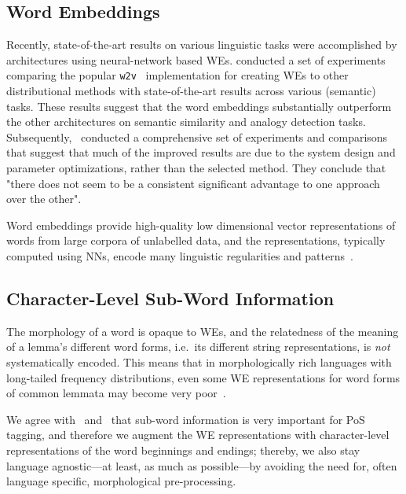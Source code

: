 \documentclass[11pt]{article}
\newcommand\wtv{\texttt{w2v}\xspace}
\begin{document}
\subsection{Word Embeddings} %

Recently, state-of-the-art results on various linguistic tasks were
accomplished by architectures using neural-network based WEs.
 conducted a set of
experiments comparing the popular
\wtv~\cite{DBLP:journals/corr/abs-1301-3781,arXiv:1310.4546}
implementation for creating WEs to other distributional methods with
state-of-the-art results across various (semantic) tasks. 
These results suggest that the word embeddings substantially
outperform the other architectures on semantic similarity and analogy
detection tasks.
Subsequently,~ conducted a comprehensive set of
experiments and comparisons that suggest that much of the improved results are
due to the system design and parameter optimizations, rather than the selected
method.  
They conclude that "there does not seem to be a consistent significant
advantage to one approach over the other".

Word embeddings provide high-quality low dimensional vector representations of
words from large corpora of unlabelled data, and the representations, typically
computed using NNs, encode many linguistic regularities and
patterns~\cite{arXiv:1310.4546}.


\subsection{Character-Level Sub-Word Information} %

The morphology of a word is opaque to WEs, and the relatedness of
the meaning of a lemma's different word forms, i.e.~its different string
representations, is \emph{not} systematically encoded. 
This means that in morphologically rich languages with long-tailed frequency
distributions, even some WE representations for word forms of common
lemmata may become very poor~\cite{DBLP:journals/corr/KimJSR15}.

We agree with~
and~ that sub-word information is very
important for PoS tagging, and therefore we augment the WE representations with
character-level representations of the word beginnings and endings; thereby, we
also stay language agnostic---at least, as much as possible---by avoiding the
need for, often language specific, morphological pre-processing.
\end{document}
